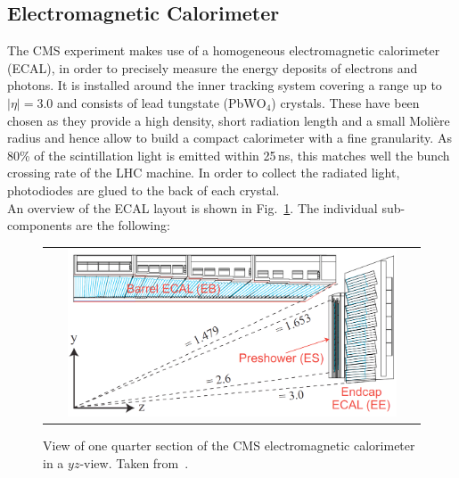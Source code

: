 \subsection{Electromagnetic Calorimeter}
\label{subsec:cms_ecal}
The CMS experiment makes use of a homogeneous electromagnetic calorimeter (ECAL), in order to precisely measure the energy deposits of electrons and photons. It is installed around the inner tracking system covering a range up to $|\eta| = 3.0$ and consists of lead tungstate (PbW$\mathrm{O}_4$) crystals. These have been chosen as they provide a high density, short radiation length and a small Moli\`{e}re radius and hence allow to build a compact calorimeter with a fine granularity. As 80\% of the scintillation light is emitted within 25\,ns, this matches well the bunch crossing rate of the LHC machine. In order to collect the radiated light, photodiodes are glued to the back of each crystal. \\
An overview of the ECAL layout is shown in Fig.~\ref{fig:CMS_ecal}. The individual sub-components are the following:
\begin{figure}[!tp]
  \centering
  \begin{tabular}{c}
    \includegraphics[width=0.9\textwidth]{figures/Figures_Experimental_Apparatus_ECALRapidity.png}
  \end{tabular}
  \caption{View of one quarter section of the CMS electromagnetic calorimeter in a $yz$-view. Taken from~\cite{bib:cmsptdr1}.}
  \label{fig:CMS_ecal}
\end{figure}

